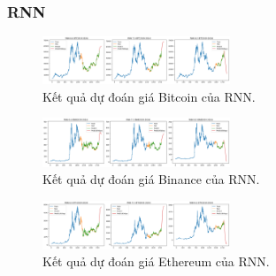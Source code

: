 \subsubsection{RNN}
\begin{figure}[h]
    \centering
    \includegraphics[width=0.5\textwidth]{bibliography/pictures/RNNbtc.png}
    \caption{Kết quả dự đoán giá Bitcoin của RNN.}
\end{figure}
\begin{figure}[h]
    \centering
    \includegraphics[width=0.5\textwidth]{bibliography/pictures/RNNbnb.png}
    \caption{Kết quả dự đoán giá Binance của RNN.}
\end{figure}
\begin{figure}[h]
    \centering
    \includegraphics[width=0.5\textwidth]{bibliography/pictures/RNNeth.png}
    \caption{Kết quả dự đoán giá Ethereum của RNN.}
\end{figure}